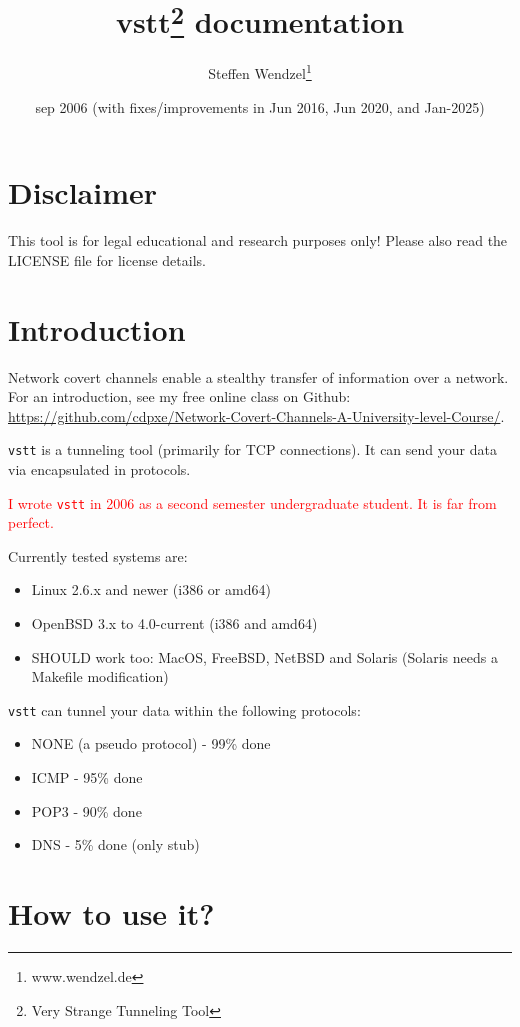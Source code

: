 \documentclass[10pt,a4paper]{article}
\author{Steffen Wendzel\footnote{www.wendzel.de}}
\title{vstt\footnote{Very Strange Tunneling Tool} documentation}
\date{sep 2006 (with fixes/improvements in Jun 2016, Jun 2020, and Jan-2025)}
\makeatletter
\def\maketitle{%
  \null
  \thispagestyle{empty}%
  \vfill
  \begin{center}\leavevmode
    \normalfont
    {\LARGE\raggedleft \@author\par}%
    \hrulefill\par
    {\huge\raggedright \textbf{\@title}\par}%
    \vskip 1cm
  \end{center}%
  \vfill
  \vfill
  \null
  \cleardoublepage
}
\makeatother
\begin{document}
\maketitle
\tableofcontents
\newpage

\section{Disclaimer}

This tool is for legal educational and research purposes only! Please also read the LICENSE file for license details.


\section{Introduction}

Network covert channels enable a stealthy transfer of information over a network. For an introduction, see my free online class on Github: \url{https://github.com/cdpxe/Network-Covert-Channels-A-University-level-Course/}.

\texttt{vstt} is a tunneling tool (primarily for TCP connections). It can send your data via encapsulated in protocols.

\textcolor{red}{I wrote \texttt{vstt} in 2006 as a second semester undergraduate student. It is far from perfect.}

Currently tested systems are:

\begin{itemize}
	\item Linux 2.6.x and newer (i386 or amd64)
	\item OpenBSD 3.x to 4.0-current (i386 and amd64)
	\item SHOULD work too: MacOS, FreeBSD, NetBSD and Solaris (Solaris needs a Makefile modification)
\end{itemize}

\texttt{vstt} can tunnel your data within the following protocols:

\begin{itemize}
	\item NONE (a pseudo protocol) - 99\% done
	\item ICMP - 95\% done
	\item POP3 - 90\% done
	\item DNS - 5\% done (only stub)
\end{itemize}

\section{How to use it?}
\end{document}
